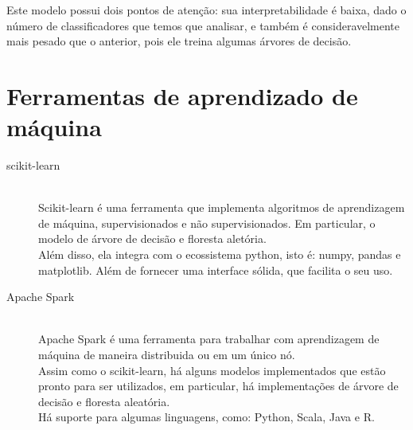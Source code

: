 \begin{description}
    Este modelo possui dois pontos de atenção: sua interpretabilidade é baixa, dado o número de classificadores que temos que analisar, e também é consideravelmente mais pesado que o anterior, pois ele treina algumas árvores de decisão.
\end{description}

\section{Ferramentas de aprendizado de máquina}

\begin{description}
    \item[scikit-learn] \hfill \\ Scikit-learn é uma ferramenta que implementa algoritmos de aprendizagem de máquina, supervisionados e não supervisionados. Em particular, o modelo de árvore de decisão e floresta aletória.\\ 
    Além disso, ela integra com o ecossistema python, isto é: numpy, pandas e matplotlib. Além de fornecer uma interface sólida, que facilita o seu uso. 

    \item[Apache Spark] \hfill \\ Apache Spark é uma ferramenta para trabalhar com aprendizagem de máquina de maneira distribuida ou em um único nó. \\
    Assim como o scikit-learn, há alguns modelos implementados que estão pronto para ser utilizados, em particular, há implementações de árvore de decisão e floresta aleatória. \\
    Há suporte para algumas linguagens, como: Python, Scala, Java e R.
\end{description}